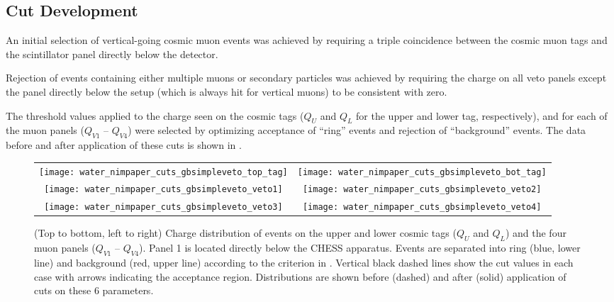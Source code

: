 \subsection{Cut Development}\label{s:cut}
An initial selection of vertical-going cosmic muon events was achieved by requiring a triple coincidence between the cosmic muon tags and the scintillator panel directly below the detector.  

Rejection of events containing either multiple muons or secondary particles was achieved by requiring the charge on all veto panels except the panel directly below the setup (which is always hit for vertical muons) to be consistent with zero.  

The threshold values applied to the charge seen on the cosmic tags ($Q_U$ and $Q_L$ for the upper and lower tag, respectively), and for each of the muon panels ($Q_{V1}$ -- $Q_{V4}$) were selected by optimizing acceptance of ``ring'' events and rejection of ``background'' events.  
The data before and after application of these cuts is shown in .

\begin{figure*}
\centering
\begin{tabular}{cc}
\texttt{[image: water\_nimpaper\_cuts\_gbsimpleveto\_top\_tag]} &
\texttt{[image: water\_nimpaper\_cuts\_gbsimpleveto\_bot\_tag]} \\
\texttt{[image: water\_nimpaper\_cuts\_gbsimpleveto\_veto1]} &
\texttt{[image: water\_nimpaper\_cuts\_gbsimpleveto\_veto2]} \\
\texttt{[image: water\_nimpaper\_cuts\_gbsimpleveto\_veto3]} &
\texttt{[image: water\_nimpaper\_cuts\_gbsimpleveto\_veto4]} \\
\end{tabular}
\caption{(Top to bottom, left to right) Charge distribution of events on the upper and lower cosmic tags ($Q_U$ and $Q_L$) and the four muon panels ($Q_{V1}$ -- $Q_{V4}$).  Panel 1 is located directly below the CHESS apparatus.  Events are separated into ring (blue, lower line) and background (red, upper line) according to the criterion in .  Vertical black dashed lines show the cut values in each case with arrows indicating the acceptance region.  Distributions are shown before (dashed) and after (solid) application of cuts on these 6 parameters.}
\label{fig:event-selection-cuts}
\end{figure*}


